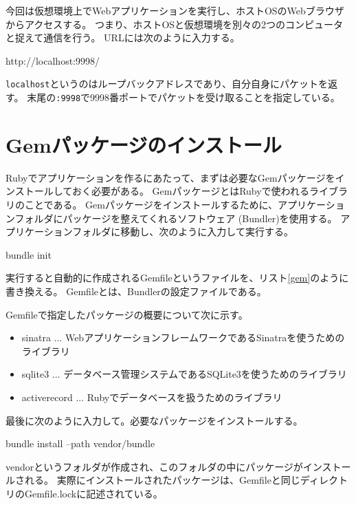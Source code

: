 \documentclass[a4j,titlepage]{jsarticle}
\begin{document}
今回は仮想環境上でWebアプリケーションを実行し、ホストOSのWebブラウザからアクセスする。
つまり、ホストOSと仮想環境を別々の2つのコンピュータと捉えて通信を行う。
URLには次のように入力する。

\begin{mdframed}
  http://localhost:9998/
\end{mdframed}

\texttt{localhost}というのはループバックアドレスであり、自分自身にパケットを返す。
末尾の\texttt{:9998}で9998番ポートでパケットを受け取ることを指定している。


\section{Gemパッケージのインストール}
Rubyでアプリケーションを作るにあたって、まずは必要なGemパッケージをインストールしておく必要がある。
GemパッケージとはRubyで使われるライブラリのことである。
Gemパッケージをインストールするために、アプリケーションフォルダにパッケージを整えてくれるソフトウェア (Bundler)を使用する。
アプリケーションフォルダに移動し、次のように入力して実行する。

\begin{mdframed}
  bundle init
\end{mdframed}

実行すると自動的に作成されるGemfileというファイルを、リスト\ref{gem}のように書き換える。
Gemfileとは、Bundlerの設定ファイルである。



Gemfileで指定したパッケージの概要について次に示す。

\begin{itemize}
  \item{sinatra ... WebアプリケーションフレームワークであるSinatraを使うためのライブラリ}
  \item{sqlite3 ... データベース管理システムであるSQLite3を使うためのライブラリ}
  \item{activerecord ... Rubyでデータベースを扱うためのライブラリ}
\end{itemize}

最後に次のように入力して。必要なパッケージをインストールする。

\begin{mdframed}
  bundle install --path vendor/bundle
\end{mdframed}

vendorというフォルダが作成され、このフォルダの中にパッケージがインストールされる。
実際にインストールされたパッケージは、Gemfileと同じディレクトリのGemfile.lockに記述されている。
\end{document}
